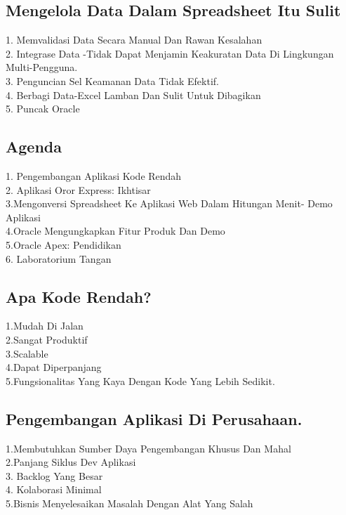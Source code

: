 \documentclass{article}
\begin{document}
{\subsection{Mengelola Data Dalam Spreadsheet Itu Sulit}
1.	Memvalidasi Data Secara Manual Dan Rawan Kesalahan\\
2.	Integrase Data -Tidak Dapat Menjamin Keakuratan Data Di Lingkungan Multi-Pengguna.\\
3.	Penguncian Sel Keamanan Data Tidak Efektif.\\
4.	Berbagi Data-Excel Lamban Dan Sulit Untuk Dibagikan\\
5.	Puncak Oracle

\subsection{Agenda}
1. Pengembangan Aplikasi Kode Rendah\\
2. Aplikasi Oror Express: Ikhtisar\\
3.Mengonversi Spreadsheet Ke Aplikasi Web Dalam Hitungan Menit- Demo Aplikasi \\
4.Oracle Mengungkapkan Fitur Produk Dan Demo\\
5.Oracle Apex: Pendidikan\\
6. Laboratorium Tangan

\subsection{Apa Kode Rendah?}
1.Mudah Di Jalan\\
2.Sangat Produktif\\
3.Scalable\\
4.Dapat Diperpanjang\\
5.Fungsionalitas Yang Kaya Dengan Kode Yang Lebih Sedikit.

\subsection{Pengembangan Aplikasi Di Perusahaan.}
1.Membutuhkan Sumber Daya Pengembangan Khusus Dan Mahal\\
2.Panjang Siklus Dev Aplikasi\\
3. Backlog Yang Besar\\
4. Kolaborasi Minimal\\
5.Bisnis Menyelesaikan Masalah Dengan Alat Yang Salah


}
\end{document}
